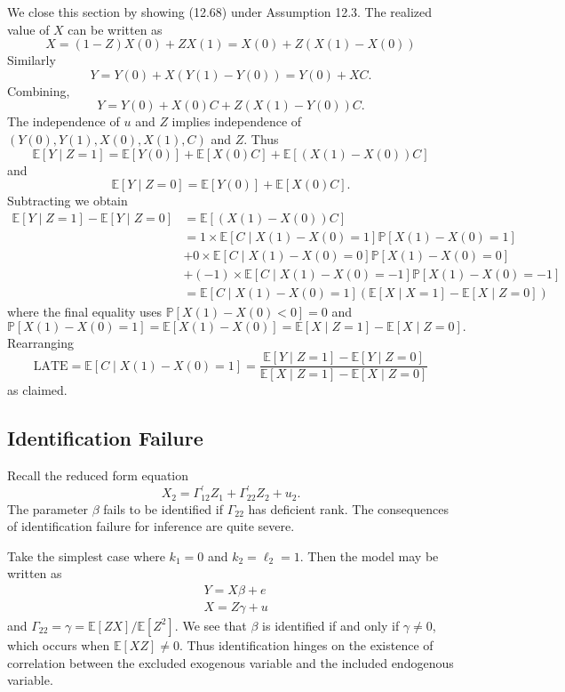 \documentclass[10pt]{article}
\begin{document}
We close this section by showing (12.68) under Assumption 12.3. The realized value of $X$ can be written as
$$
X=(1-Z) X(0)+Z X(1)=X(0)+Z(X(1)-X(0))
$$
Similarly
$$
Y=Y(0)+X(Y(1)-Y(0))=Y(0)+X C .
$$
Combining,
$$
Y=Y(0)+X(0) C+Z(X(1)-Y(0)) C .
$$
The independence of $u$ and $Z$ implies independence of $(Y(0), Y(1), X(0), X(1), C)$ and $Z$. Thus
$$
\mathbb{E}[Y \mid Z=1]=\mathbb{E}[Y(0)]+\mathbb{E}[X(0) C]+\mathbb{E}[(X(1)-X(0)) C]
$$
and
$$
\mathbb{E}[Y \mid Z=0]=\mathbb{E}[Y(0)]+\mathbb{E}[X(0) C] .
$$
Subtracting we obtain
$$
\begin{aligned}
\mathbb{E}[Y \mid Z=1]-\mathbb{E}[Y \mid Z=0] &=\mathbb{E}[(X(1)-X(0)) C] \\
&=1 \times \mathbb{E}[C \mid X(1)-X(0)=1] \mathbb{P}[X(1)-X(0)=1] \\
&+0 \times \mathbb{E}[C \mid X(1)-X(0)=0] \mathbb{P}[X(1)-X(0)=0] \\
&+(-1) \times \mathbb{E}[C \mid X(1)-X(0)=-1] \mathbb{P}[X(1)-X(0)=-1] \\
&=\mathbb{E}[C \mid X(1)-X(0)=1](\mathbb{E}[X \mid X=1]-\mathbb{E}[X \mid Z=0])
\end{aligned}
$$
where the final equality uses $\mathbb{P}[X(1)-X(0)<0]=0$ and
$$
\mathbb{P}[X(1)-X(0)=1]=\mathbb{E}[X(1)-X(0)]=\mathbb{E}[X \mid Z=1]-\mathbb{E}[X \mid Z=0] .
$$
Rearranging
$$
\mathrm{LATE}=\mathbb{E}[C \mid X(1)-X(0)=1]=\frac{\mathbb{E}[Y \mid Z=1]-\mathbb{E}[Y \mid Z=0]}{\mathbb{E}[X \mid Z=1]-\mathbb{E}[X \mid Z=0]}
$$
as claimed.

\subsection{Identification Failure}
Recall the reduced form equation
$$
X_{2}=\Gamma_{12}^{\prime} Z_{1}+\Gamma_{22}^{\prime} Z_{2}+u_{2} .
$$
The parameter $\beta$ fails to be identified if $\Gamma_{22}$ has deficient rank. The consequences of identification failure for inference are quite severe.

Take the simplest case where $k_{1}=0$ and $k_{2}=\ell_{2}=1$. Then the model may be written as
$$
\begin{aligned}
&Y=X \beta+e \\
&X=Z \gamma+u
\end{aligned}
$$
and $\Gamma_{22}=\gamma=\mathbb{E}[Z X] / \mathbb{E}\left[Z^{2}\right]$. We see that $\beta$ is identified if and only if $\gamma \neq 0$, which occurs when $\mathbb{E}[X Z] \neq 0$. Thus identification hinges on the existence of correlation between the excluded exogenous variable and the included endogenous variable.
\end{document}
